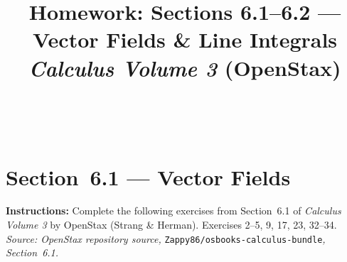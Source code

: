 \documentclass[12pt, twoside]{article}
\title{Homework: Sections 6.1--6.2 --- Vector Fields \& Line Integrals\\[0.3em]
{\large\textit{Calculus Volume 3} (OpenStax)}}
\makeatletter
\renewcommand{\maketitle}{%
  \begin{center}
    {\LARGE\textbf{\@title}}\\[0.4em]
  \end{center}
  \vspace{-0.5em}
}
\makeatother
\begin{document}
\maketitle

\section*{Section~6.1 --- Vector Fields}

\noindent\textbf{Instructions:} Complete the following exercises from Section~6.1 of
\textit{Calculus Volume 3} by OpenStax (Strang \& Herman). Exercises 2--5, 9, 17, 23, 32--34.\\[0.3em]
\noindent\textit{Source: OpenStax repository source,} \texttt{Zappy86/osbooks-calculus-bundle}\textit{, Section~6.1.}

\bigskip
\end{document}
